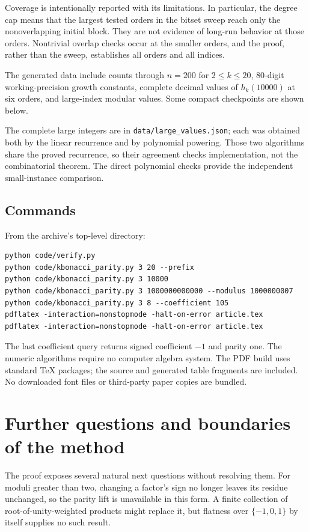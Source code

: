 \documentclass[11pt]{article}
\numberwithin{equation}{section}
\theoremstyle{definition}
\theoremstyle{remark}
\begin{document}
Coverage is intentionally reported with its limitations. In particular,
the degree cap means that the largest tested orders in the bitset sweep
reach only the nonoverlapping initial block. They are not evidence of
long-run behavior at those orders. Nontrivial overlap checks occur at the
smaller orders, and the proof, rather than the sweep, establishes all
orders and all indices.

The generated data include counts through $n=200$ for $2\le k\le20$,
80-digit working-precision growth constants, complete decimal values of
$h_k(10000)$ at six orders, and large-index modular values. Some compact
checkpoints are shown below.

The complete large integers are in \texttt{data/large\_values.json}; each
was obtained both by the linear recurrence and by polynomial powering.
Those two algorithms share the proved recurrence, so their agreement
checks implementation, not the combinatorial theorem. The direct
polynomial checks provide the independent small-instance comparison.

\subsection{Commands}
From the archive's top-level directory:
\begin{lstlisting}
python code/verify.py
python code/kbonacci_parity.py 3 20 --prefix
python code/kbonacci_parity.py 3 10000
python code/kbonacci_parity.py 3 1000000000000 --modulus 1000000007
python code/kbonacci_parity.py 3 8 --coefficient 105
pdflatex -interaction=nonstopmode -halt-on-error article.tex
pdflatex -interaction=nonstopmode -halt-on-error article.tex
\end{lstlisting}
The last coefficient query returns signed coefficient $-1$ and parity one.
The numeric algorithms require no computer algebra system. The PDF build
uses standard TeX packages; the source and generated table fragments are
included. No downloaded font files or third-party paper copies are bundled.

\section{Further questions and boundaries of the method}
The proof exposes several natural next questions without resolving them.
For moduli greater than two, changing a factor's sign no longer leaves
its residue unchanged, so the parity lift is unavailable in this form.
A finite collection of root-of-unity-weighted products might replace it,
but flatness over $\{-1,0,1\}$ by itself supplies no such result.
\end{document}
